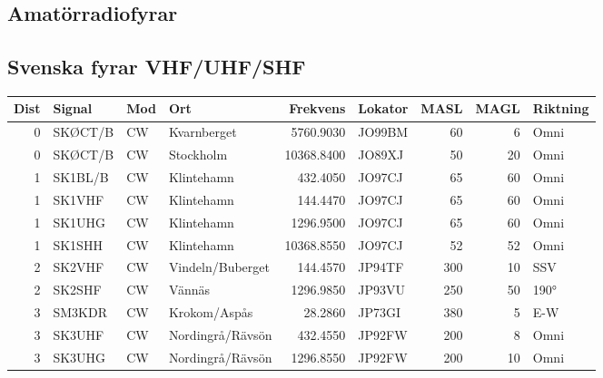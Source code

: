 \begin{landscape}
\section{Amatörradiofyrar}
\subsection{Svenska fyrar VHF/UHF/SHF}
\begin{longtable}{rlllrlrrl}
	          \bf Dist & \bf Signal & \bf Mod & \bf Ort                & \bf Frekvens & \bf Lokator & \bf MASL & \bf MAGL & \bf Riktning \\ \hline
	\endhead
	                 0 & SKØCT/B    & CW      & Kvarnberget            &    5760.9030 & JO99BM      &       60 &        6 & Omni         \\
	                 0 & SKØCT/B    & CW      & Stockholm              &   10368.8400 & JO89XJ      &       50 &       20 & Omni         \\
	                 1 & SK1BL/B    & CW      & Klintehamn             &     432.4050 & JO97CJ      &       65 &       60 & Omni         \\
	                 1 & SK1VHF     & CW      & Klintehamn             &     144.4470 & JO97CJ      &       65 &       60 & Omni         \\
	                 1 & SK1UHG     & CW      & Klintehamn             &    1296.9500 & JO97CJ      &       65 &       60 & Omni         \\
	                 1 & SK1SHH     & CW      & Klintehamn             &   10368.8550 & JO97CJ      &       52 &       52 & Omni         \\
	                 2 & SK2VHF     & CW      & Vindeln/Buberget       &     144.4570 & JP94TF      &      300 &       10 & SSV          \\
	                 2 & SK2SHF     & CW      & Vännäs                 &    1296.9850 & JP93VU      &      250 &       50 & 190°         \\
	                 3 & SM3KDR     & CW      & Krokom/Aspås           &      28.2860 & JP73GI      &      380 &        5 & E-W          \\
	                 3 & SK3UHF     & CW      & Nordingrå/Rävsön       &     432.4550 & JP92FW      &      200 &        8 & Omni         \\
	                 3 & SK3UHG     & CW      & Nordingrå/Rävsön       &    1296.8550 & JP92FW      &      200 &       10 & Omni         \\

\end{longtable}
\end{landscape}
